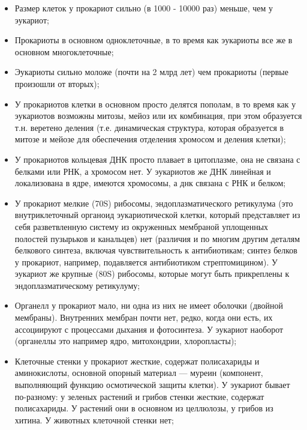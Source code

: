 \begin{itemize}
	\item Размер клеток у прокариот сильно (в 1000 - 10000 раз) меньше, чем у эукариот;
	
	\item Прокариоты в основном одноклеточные, в то время как эукариоты все же в основном многоклеточные;
	
	\item Эукариоты сильно моложе (почти на 2 млрд лет) чем прокариоты (первые произошли от вторых);
	
	\item У прокариотов клетки в основном просто делятся пополам, в то время как у эукариотов возможны митозы, мейоз или их комбинация, при этом образуется т.н. веретено деления (т.е. динамическая структура, которая образуется в митозе и мейозе для обеспечения отделения хромосом и деления клетки);
	
	\item У прокариотов кольцевая ДНК просто плавает в цитоплазме, она не связана с белками или РНК, а хромосом нет. У эукариотов же ДНК линейная и локализована в ядре, имеются хромосомы, а днк связана с РНК и белком;
	
	\item У прокариот мелкие (70S) рибосомы, эндоплазматического ретикулума (это внутриклеточный органоид эукариотической клетки, который представляет из себя разветвленную систему из окруженных мембраной уплощенных полостей пузырьков и канальцев) нет (различия и по многим другим деталям белкового синтеза, включая чувствительность к антибиотикам; синтез белков у прокариот, например, подавляется антибиотиком стрептомицином). У эукариот же крупные (80S) рибосомы, которые могут быть прикреплены к эндоплазматическому ретикулуму;
	
	\item Органелл у прокариот мало, ни одна из них не имеет оболочки (двойной мембраны). Внутренних мембран почти нет, редко, когда они есть, их ассоциируют с процессами дыхания и фотосинтеза. У эукариот наоборот (органеллы это например ядро, митохондрии, хлоропласты);
	
	\item Клеточные стенки у прокариот жесткие, содержат полисахариды и аминокислоты, основной опорный материал --- муреин (компонент, выполняющий функцию осмотической защиты клетки). У эукариот бывает по-разному: у зеленых растений и грибов стенки жесткие, содержат полисахариды. У растений они в основном из целлюлозы, у грибов из хитина. У животных клеточной стенки нет;
	

\end{itemize}
